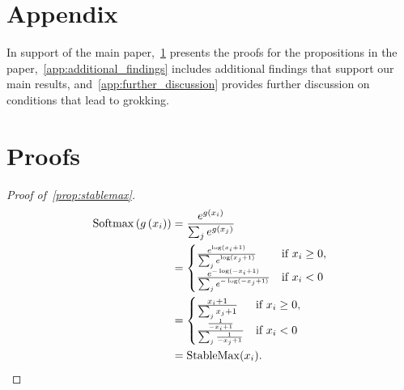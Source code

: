 
\newpage
\appendix
\section*{Appendix}
In support of the main paper,~\cref{app:proofs} presents the proofs for the propositions in the paper,~\cref{app:additional_findings} includes additional findings that support our main results, and~\cref{app:further_discussion} provides further discussion on conditions that lead to grokking.
\section{Proofs}\label{app:proofs}
\begin{proof}[Proof of~\cref{prop:stablemax}]
\begin{align}
    \mathrm{Softmax}\left(g\left(x_i\right)\right) &= \frac{e^{g(x_i)}}{\sum_j e^{g(x_j)}}\\
    &= \begin{cases}
\frac{e^{\log(x_i+1)}}{\sum_j e^{\log(x_j+1)}} & \text{if } x_i \geq 0, \\
\frac{e^{-\log(-x_i+1)}}{\sum_j e^{-\log(-x_j+1)}} & \text{if } x_i < 0
\end{cases}\\
&= \begin{cases}
\frac{x_i+1}{\sum_j x_j+1} & \text{if } x_i \geq 0, \\
\frac{\frac{1}{-x_i+1}}{\sum_j \frac{1}{-x_j+1}} & \text{if } x_i < 0
\end{cases}\\
&= \mathrm{StableMax}(x_i).
\end{align}
\end{proof}

